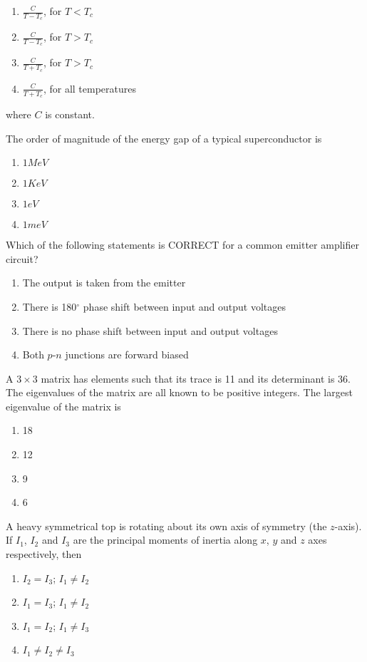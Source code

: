 \begin{enumerate}
    \item $\frac{C}{T-T_c}$, for $T < T_c$
    \item $\frac{C}{T-T_c}$, for $T > T_c$
    \item $\frac{C}{T+T_c}$, for $T > T_c$
    \item $\frac{C}{T+T_c}$, for all temperatures
\end{enumerate}
where $C$ is constant.
\item The order of magnitude of the energy gap of a typical superconductor is
\begin{enumerate}
    \item $1MeV$
    \item $1KeV$
    \item $1eV$
    \item $1meV$
\end{enumerate}
\item Which of the following statements is CORRECT for a common emitter amplifier circuit?
\begin{enumerate}
    \item The output is taken from the emitter
    \item There is 180$^\circ$ phase shift between input and output voltages
    \item There is no phase shift between input and output voltages
    \item Both $p$-$n$ junctions are forward biased
\end{enumerate}
\item A $3\times3$ matrix has elements such that its trace is 11 and its determinant is 36. The eigenvalues of the matrix are all known to be positive integers. The largest eigenvalue of the matrix is
\begin{enumerate}
    \item 18
    \item 12
    \item 9
    \item 6
\end{enumerate}
\item A heavy symmetrical top is rotating about its own axis of symmetry (the $z$-axis). If $I_1$, $I_2$ and $I_3$ are the
principal moments of inertia along $x$, $y$ and $z$ axes respectively, then
\begin{enumerate}
    \item $I_2 = I_3$; $I_1 \neq I_2$
    \item $I_1 = I_3$; $I_1 \neq I_2$
    \item $I_1 = I_2$; $I_1 \neq I_3$
    \item $I_1 \neq I_2 \neq I_3$
\end{enumerate}
